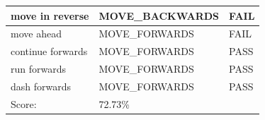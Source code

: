 \documentclass[11pt]{article}
\begin{document}
\begin{table}[]
\begin{tabular}{lll}
\multicolumn{1}{l|}{move in reverse}                & \multicolumn{1}{l|}{MOVE\_BACKWARDS}    & \cellcolor[HTML]{FD6864}FAIL \\ \hline
\multicolumn{1}{l|}{move ahead}                     & \multicolumn{1}{l|}{MOVE\_FORWARDS}     & \cellcolor[HTML]{FD6864}FAIL \\ \hline
\multicolumn{1}{l|}{continue forwards}              & \multicolumn{1}{l|}{MOVE\_FORWARDS}     & \cellcolor[HTML]{67FD9A}PASS \\ \hline
\multicolumn{1}{l|}{run forwards}                   & \multicolumn{1}{l|}{MOVE\_FORWARDS}     & \cellcolor[HTML]{67FD9A}PASS \\ \hline
\multicolumn{1}{l|}{dash forwards}                  & \multicolumn{1}{l|}{MOVE\_FORWARDS}     & \cellcolor[HTML]{67FD9A}PASS \\ \hline
\multicolumn{1}{l|}{Score:}                         & \multicolumn{1}{l|}{72.73\%}            &                              \\
\end{tabular}
\end{table}
\end{document}
